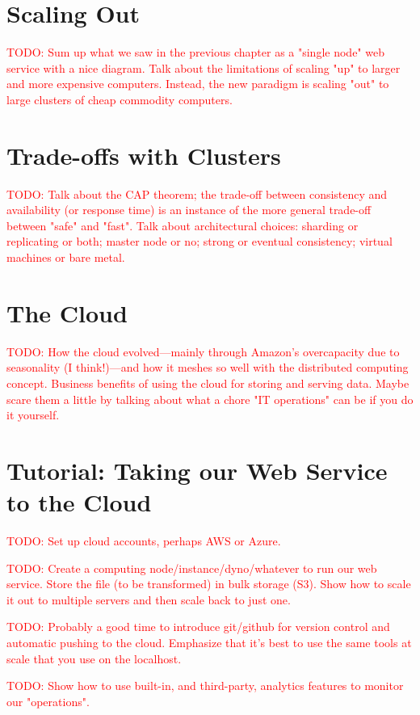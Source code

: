\documentclass[11pt]{book}
\newcommand{\todo}[1]{\textcolor{red}{TODO: #1}} %
\begin{document}
\section{Scaling Out}
\todo{Sum up what we saw in the previous chapter as a "single node" web service with a nice diagram.  Talk about the limitations of scaling "up" to larger and more expensive computers.  Instead, the new paradigm is scaling "out" to large clusters of cheap commodity computers.}

\section{Trade-offs with Clusters}
\todo{Talk about the CAP theorem; the trade-off between consistency and availability (or response time) is an instance of the more general trade-off between "safe" and "fast".  Talk about architectural choices: sharding or replicating or both; master node or no; strong or eventual consistency; virtual machines or bare metal.}

\section{The Cloud}
\todo{How the cloud evolved---mainly through Amazon's overcapacity due to seasonality (I think!)---and how it meshes so well with the distributed computing concept.  Business benefits of using the cloud for storing and serving data.  Maybe scare them a little by talking about what a chore "IT operations" can be if you do it yourself.}



\section*{Tutorial: Taking our Web Service to the Cloud}

\todo{Set up cloud accounts, perhaps AWS or Azure.}

\todo{Create a computing node/instance/dyno/whatever to run our web service.  Store the file (to be transformed) in bulk storage (S3).  Show how to scale it out to multiple servers and then scale back to just one.} 

\todo{Probably a good time to introduce git/github for version control and automatic pushing to the cloud.  Emphasize that it's best to use the same tools at scale that you use on the localhost.}

\todo{Show how to use built-in, and third-party, analytics features to monitor our "operations".}
\end{document}

